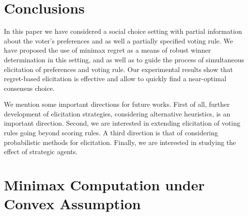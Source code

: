 \section{Conclusions}  \label{sec:conclusions}
In this paper we have considered a  social choice setting with partial  information about the voter's  
preferences and as well a partially specified voting rule.
We have proposed the use of minimax regret as a means of robust winner determination in this setting, and as well as to guide the process of simultaneous elicitation of preferences and voting rule.
Our experimental results %
show that regret-based elicitation is effective and allow to quickly find a near-optimal consensus choice.

We mention some  important directions for future works.
First of all, further development of elicitation strategies, considering alternative heuristics, is an important direction. 
Second, we are interested in extending elicitation of voting rules going beyond scoring rules.
A third direction is that of considering probabilistic methods for elicitation.
Finally, we are interested in studying the effect of strategic agents. %



% 

\pagebreak
\ifappendix
\appendix
\section{Minimax Computation under Convex Assumption} 

